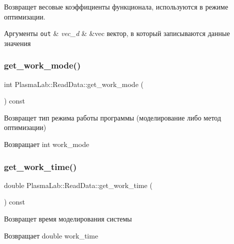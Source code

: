 Возвращет весовые коэффициенты функционала, используются в режиме оптимизации. 
\begin{DoxyParams}[1]{Аргументы}
\mbox{\tt out}  & {\em vec\+\_\+d} & \&vec вектор, в который записываются данные значения \\
\hline
\end{DoxyParams}
\mbox{\label{class_plasma_lab_1_1_read_data_a5a8c0f760a96a5e745e402512e221304}} 
\subsubsection{\texorpdfstring{get\+\_\+work\+\_\+mode()}{get\_work\_mode()}}
{\footnotesize\ttfamily int Plasma\+Lab\+::\+Read\+Data\+::get\+\_\+work\+\_\+mode (\begin{DoxyParamCaption}{ }\end{DoxyParamCaption}) const\hspace{0.3cm}{\ttfamily [inline]}}

Возвращет тип режима работы программы (моделирование либо метод оптимизации) \begin{DoxyReturn}{Возвращает}
int work\+\_\+mode 
\end{DoxyReturn}
\mbox{\label{class_plasma_lab_1_1_read_data_a86e2d9791886b7aa02d3c2551d211ceb}} 
\subsubsection{\texorpdfstring{get\+\_\+work\+\_\+time()}{get\_work\_time()}}
{\footnotesize\ttfamily double Plasma\+Lab\+::\+Read\+Data\+::get\+\_\+work\+\_\+time (\begin{DoxyParamCaption}{ }\end{DoxyParamCaption}) const\hspace{0.3cm}{\ttfamily [inline]}}

Возвращет время моделирования системы \begin{DoxyReturn}{Возвращает}
double work\+\_\+time 
\end{DoxyReturn}
\mbox{\label{class_plasma_lab_1_1_read_data_af83f850f05b3e800a574dadbddb453f4}} 
